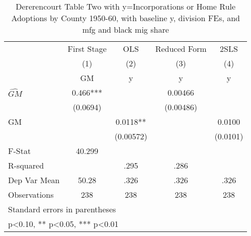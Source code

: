 \begin{table}[htbp]\centering
\def\sym#1{\ifmmode^{#1}\else\(^{#1}\)\fi}
\caption{Dererencourt Table Two with y=Incorporations or Home Rule Adoptions by County 1950-60, with baseline y, division FEs, and mfg and black mig share}
\begin{tabular}{l*{4}{c}}
\toprule
                    & First Stage   &         OLS   &Reduced Form   &        2SLS   \\
                    &\multicolumn{1}{c}{(1)}&\multicolumn{1}{c}{(2)}&\multicolumn{1}{c}{(3)}&\multicolumn{1}{c}{(4)}\\
                    &\multicolumn{1}{c}{GM}&\multicolumn{1}{c}{y}&\multicolumn{1}{c}{y}&\multicolumn{1}{c}{y}\\
\midrule
$\hat{GM}$          &       0.466***&               &     0.00466   &               \\
                    &    (0.0694)   &               &   (0.00486)   &               \\
\addlinespace
GM                  &               &      0.0118** &               &      0.0100   \\
                    &               &   (0.00572)   &               &    (0.0101)   \\
\midrule
F-Stat              &      40.299   &               &               &               \\
R-squared           &               &        .295   &        .286   &               \\
Dep Var Mean        &       50.28   &        .326   &        .326   &        .326   \\
Observations        &         238   &         238   &         238   &         238   \\
\bottomrule
\multicolumn{5}{l}{\footnotesize Standard errors in parentheses}\\
\multicolumn{5}{l}{\footnotesize * p<0.10, ** p<0.05, *** p<0.01}\\
\end{tabular}
\end{table}
